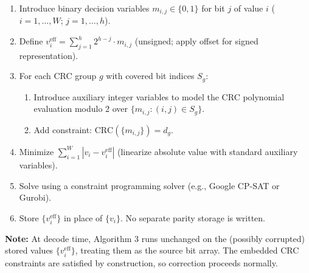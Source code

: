 \begin{enumerate}
    \item Introduce binary decision variables $m_{i,j} \in \{0,1\}$ for bit $j$ of value $i$ ($i = 1,\ldots,W$; $j = 1,\ldots,h$).
    \item Define $v_i^{\text{eff}} = \sum_{j=1}^{h} 2^{h-j} \cdot m_{i,j}$ (unsigned; apply offset for signed representation).
    \item For each CRC group $g$ with covered bit indices $S_g$:
    \begin{enumerate}
        \item Introduce auxiliary integer variables to model the CRC polynomial evaluation modulo 2 over $\{m_{i,j} : (i,j) \in S_g\}$.
        \item Add constraint: $\text{CRC}(\{m_{i,j}\}) = d_g$.
    \end{enumerate}
    \item Minimize $\sum_{i=1}^{W} |v_i - v_i^{\text{eff}}|$ (linearize absolute value with standard auxiliary variables).
    \item Solve using a constraint programming solver (e.g., Google CP-SAT or Gurobi).
    \item Store $\{v_i^{\text{eff}}\}$ in place of $\{v_i\}$. No separate parity storage is written.
\end{enumerate}

\textbf{Note:} At decode time, Algorithm 3 runs unchanged on the (possibly corrupted) stored values $\{v_i^{\text{eff}}\}$, treating them as the source bit array. The embedded CRC constraints are satisfied by construction, so correction proceeds normally.
